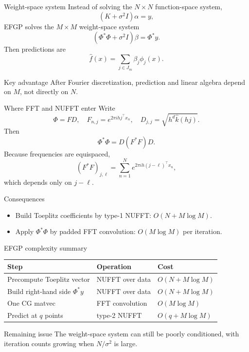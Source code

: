 \documentclass[aspectratio=169,10pt]{beamer}
\newcommand{\sig}{\sigma^2}
\begin{document}
\begin{frame}{Weight-space system}
Instead of solving the $N\times N$ function-space system,
\[
(K+\sig I)\alpha=y,
\]
EFGP solves the $M\times M$ weight-space system
\[
(\Phi^*\Phi+\sig I)\beta = \Phi^*y.
\]
Then predictions are
\[
\hat f(x)=\sum_{j\in J_m}\beta_j\phi_j(x).
\]

\begin{block}{Key advantage}
After Fourier discretization, prediction and linear algebra depend on $M$, not directly on $N$.
\end{block}
\end{frame}

\begin{frame}{Where FFT and NUFFT enter}
Write
\[
\Phi = F D,
\quad
F_{n,j}=e^{2\pi i h j^\top x_n},
\quad
D_{j,j}=\sqrt{h^d\widehat{k}(hj)}.
\]
Then
\[
\Phi^*\Phi=D(F^*F)D.
\]
Because frequencies are equispaced,
\[
(F^*F)_{j,\ell}=\sum_{n=1}^N e^{2\pi i h(j-\ell)^\top x_n},
\]
which depends only on $j-\ell$.

\begin{block}{Consequences}
\begin{itemize}
  \item Build Toeplitz coefficients by type-1 NUFFT: $O(N+M\log M)$.
  \item Apply $\Phi^*\Phi$ by padded FFT convolution: $O(M\log M)$ per iteration.
\end{itemize}
\end{block}
\end{frame}

\begin{frame}{EFGP complexity summary}
\begin{center}
\begin{tabular}{lll}
\toprule
Step & Operation & Cost \\
\midrule
Precompute Toeplitz vector & NUFFT over data & $O(N+M\log M)$ \\
Build right-hand side $\Phi^*y$ & NUFFT over data & $O(N+M\log M)$ \\
One CG matvec & FFT convolution & $O(M\log M)$ \\
Predict at $q$ points & type-2 NUFFT & $O(q+M\log M)$ \\
\bottomrule
\end{tabular}
\end{center}

\vspace{0.8em}
\begin{alertblock}{Remaining issue}
The weight-space system can still be poorly conditioned, with iteration counts growing when $N/\sigma^2$ is large.
\end{alertblock}
\end{frame}
\end{document}
